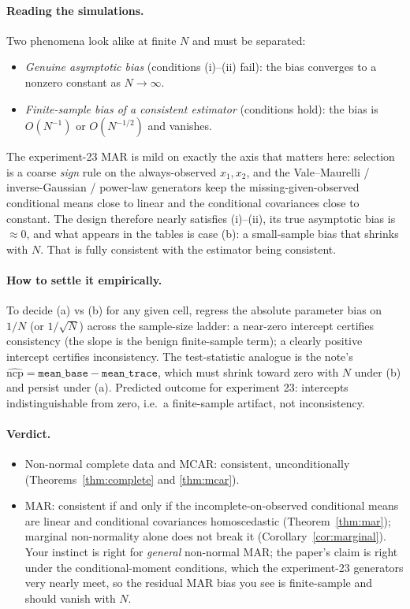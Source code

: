 \documentclass[11pt]{article}
\theoremstyle{plain}
\theoremstyle{remark}
\begin{document}
\paragraph{Reading the simulations.}
Two phenomena look alike at finite $N$ and must be separated:
\begin{itemize}
  \item[(a)] \emph{Genuine asymptotic bias} (conditions (i)--(ii) fail): the
        bias converges to a nonzero constant as $N\to\infty$.
  \item[(b)] \emph{Finite-sample bias of a consistent estimator} (conditions
        hold): the bias is $O(N^{-1})$ or $O(N^{-1/2})$ and vanishes.
\end{itemize}
The experiment-23 MAR is mild on exactly the axis that matters here: selection
is a coarse \emph{sign} rule on the always-observed $x_1,x_2$, and the
Vale--Maurelli / inverse-Gaussian / power-law generators keep the
missing-given-observed conditional means close to linear and the conditional
covariances close to constant. The design therefore nearly satisfies
(i)--(ii), its true asymptotic bias is $\approx0$, and what appears in the
tables is case (b): a small-sample bias that shrinks with $N$. That is fully
consistent with the estimator being consistent.

\paragraph{How to settle it empirically.}
To decide (a) vs (b) for any given cell, regress the absolute parameter bias on
$1/N$ (or $1/\sqrt N$) across the sample-size ladder: a near-zero intercept
certifies consistency (the slope is the benign finite-sample term); a clearly
positive intercept certifies inconsistency. The test-statistic analogue is the
note's $\widehat{\mathrm{ncp}}=\texttt{mean\_base}-\texttt{mean\_trace}$, which
must shrink toward zero with $N$ under (b) and persist under (a). Predicted
outcome for experiment 23: intercepts indistinguishable from zero, i.e.\ a
finite-sample artifact, not inconsistency.

\paragraph{Verdict.}
\begin{itemize}
  \item Non-normal complete data and MCAR: consistent, unconditionally
        (Theorems~\ref{thm:complete} and \ref{thm:mcar}).
  \item MAR: consistent if and only if the incomplete-on-observed conditional
        means are linear and conditional covariances homoscedastic
        (Theorem~\ref{thm:mar}); marginal non-normality alone does not break it
        (Corollary~\ref{cor:marginal}). Your instinct is right for
        \emph{general} non-normal MAR; the paper's claim is right under the
        conditional-moment conditions, which the experiment-23 generators very
        nearly meet, so the residual MAR bias you see is finite-sample and
        should vanish with $N$.
\end{itemize}
\end{document}
